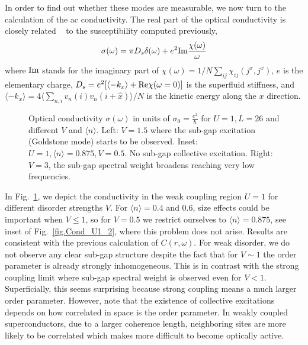\documentclass[Collective.tex]{revtex4-1}
\begin{document}
In order to find out whether these modes are measurable, we now turn to the calculation of the ac conductivity.  
The real part of the optical conductivity is closely related ~\cite{cea2014,cea2015,Seibold2015} to the susceptibility computed previously,
\begin{equation}
	\sigma(\omega) = \pi D_s\delta(\omega) + e^2{\rm Im} \frac{\chi(\omega)}{\omega} \label{sigma}
\end{equation} 
where $\rm Im$ stands for the imaginary part of $\chi(\omega) = 1/N\sum_{ij}\chi_{ij}(j^x,j^x)$, $e$ is the elementary charge, $D_s = e^2 [\langle -k_x \rangle + {\rm Re} \chi(\omega=0)]$ is the superfluid stiffness, and $\langle -k_x \rangle = 4\langle \sum_{n,i} v_n(i)v_n(i+\hat{x}) \rangle /N$ is the kinetic energy along the $x$ direction.
\begin{figure}
		\caption{Optical conductivity $\sigma(\omega)$ in units of $\sigma_0=\frac{e^2}{\hbar}$ for $U=1, L=26$ and different $V$ and $\langle n \rangle$. Left:   $V=1.5$ where the sub-gap excitation (Goldstone mode) starts to be observed. Inset: $U=1, \langle n \rangle =0.875, V=0.5$. No sub-gap collective excitation. Right:
			 $V=3$, the sub-gap spectral weight broadens reaching very low frequencies. 
		} \label{Fig.Cond_U1}
\end{figure}
In Fig.~\ref{Fig.Cond_U1}, we depict the conductivity in the weak coupling region $U=1$ for different disorder strengths $V$. For $\langle n \rangle =0.4$ and $0.6$, size effects could be important when $V \leq 1$, so for $V=0.5$ we restrict ourselves to $\langle n \rangle = 0.875$, see inset of Fig.~\ref{fig.Cond_U1_2}, where this problem does not arise. Results are consistent with the previous calculation of $C(r,\omega)$. 
For weak disorder, we do not observe any clear sub-gap structure despite the fact that for $V \sim 1$ the order parameter is already strongly inhomogeneous. This is in contrast with the strong coupling limit \cite{cea2014,Supplementary} where sub-gap spectral weight is observed even for $V < 1$. Superficially, this seems surprising because strong coupling means a much larger order parameter. However, note that the existence of collective excitations depends on how correlated in space is the order parameter.  In weakly coupled superconductors, due to a larger coherence length, neighboring sites are more likely to be correlated which makes more difficult to become optically active.
\end{document}
